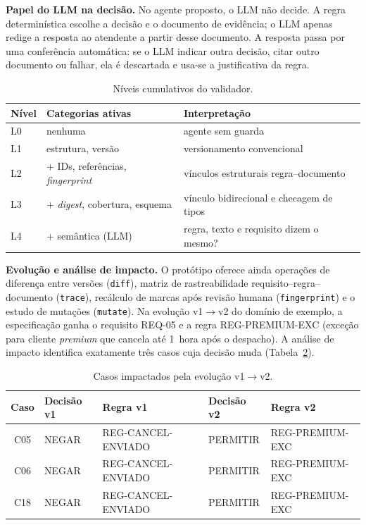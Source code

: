 \documentclass[12pt]{article}
\newcommand{\code}[1]{\texttt{#1}}
\begin{document}
\textbf{Papel do LLM na decisão.} No agente proposto, o LLM não decide. A regra determinística escolhe a decisão e o documento de evidência; o LLM apenas redige a resposta ao atendente a partir desse documento. A resposta passa por uma conferência automática: se o LLM indicar outra decisão, citar outro documento ou falhar, ela é descartada e usa-se a justificativa da regra.

\begin{table}[!ht]
\centering
\caption{Níveis cumulativos do validador.}
\label{tab:niveis}
\small
\begin{tabularx}{0.95\linewidth}{l l X}
\toprule
\textbf{Nível} & \textbf{Categorias ativas} & \textbf{Interpretação} \\
\midrule
L0 & nenhuma & agente sem guarda \\
L1 & estrutura, versão & versionamento convencional \\
L2 & + IDs, referências, \textit{fingerprint} & vínculos estruturais regra--documento \\
L3 & + \textit{digest}, cobertura, esquema & vínculo bidirecional e checagem de tipos \\
L4 & + semântica (LLM) & regra, texto e requisito dizem o mesmo? \\
\bottomrule
\end{tabularx}
\end{table}

\textbf{Evolução e análise de impacto.} O protótipo oferece ainda operações de diferença entre versões (\code{diff}), matriz de rastreabilidade requisito--regra--documento (\code{trace}), recálculo de marcas após revisão humana (\code{fingerprint}) e o estudo de mutações (\code{mutate}). Na evolução v1$\rightarrow$v2 do domínio de exemplo, a especificação ganha o requisito REQ-05 e a regra REG-PREMIUM-EXC (exceção para cliente \textit{premium} que cancela até 1~hora após o despacho). A análise de impacto identifica exatamente três casos cuja decisão muda (Tabela~\ref{tab:diff}).

\begin{table}[!ht]
\centering
\caption{Casos impactados pela evolução v1$\rightarrow$v2.}
\label{tab:diff}
\small
\begin{tabular}{c l l l l}
\toprule
\textbf{Caso} & \textbf{Decisão v1} & \textbf{Regra v1} & \textbf{Decisão v2} & \textbf{Regra v2} \\
\midrule
C05 & NEGAR & REG-CANCEL-ENVIADO & PERMITIR & REG-PREMIUM-EXC \\
C06 & NEGAR & REG-CANCEL-ENVIADO & PERMITIR & REG-PREMIUM-EXC \\
C18 & NEGAR & REG-CANCEL-ENVIADO & PERMITIR & REG-PREMIUM-EXC \\
\bottomrule
\end{tabular}
\end{table}
\end{document}
